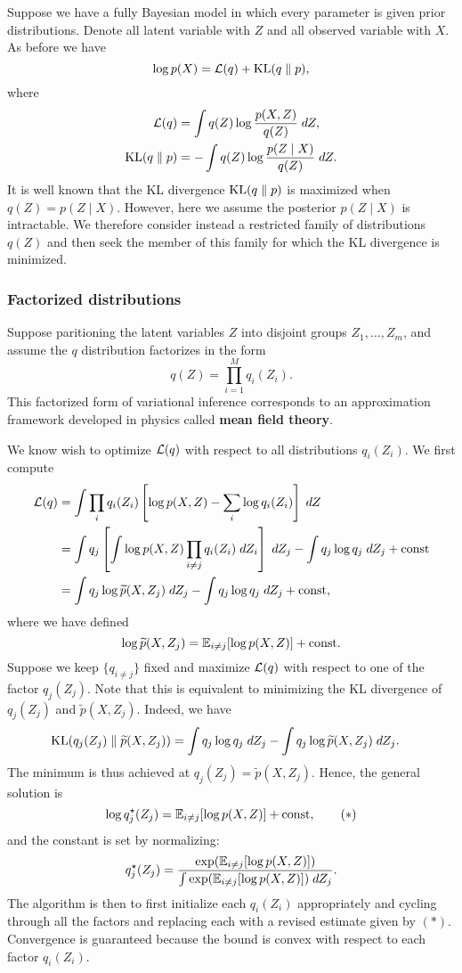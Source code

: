 \documentclass[a4paper]{article}
\begin{document}
Suppose we have a fully Bayesian model in which every parameter
is given prior distributions. Denote all latent variable with
$Z$ and all observed variable with $X$. As before we have
\[
\log p(X) = \mathcal{L}(q) + \mathrm{KL}(q \; \Vert \; p),
\]
where
\[
\begin{aligned}
  \mathcal{L}(q) &= \int q(Z) \log \frac{p(X, Z)}{q(Z)} \; d Z, \\
  \mathrm{KL}(q \; \Vert \; p) &= - \int q(Z) \log \frac{p(Z \mid X)}{q(Z)}
  \; d Z.
\end{aligned}
\]
It is well known that the KL divergence $\mathrm{KL}(q \; \Vert \; p)$ is
maximized when $q(Z) = p(Z \mid X)$. However, here we
assume the posterior $p(Z \mid X)$ is intractable.
We therefore consider instead a restricted family of
distributions $q(Z)$ and then seek the member of this
family for which the KL divergence is minimized.

\subsubsection{Factorized distributions}
Suppose paritioning the latent variables $Z$ into disjoint
groups $Z_1, \dots, Z_m$, and assume the $q$ distribution
factorizes in the form
\[
q(Z) = \prod_{i=1}^M q_i(Z_i).
\]
This factorized form of variational inference corresponds to an
approximation framework developed in physics called \textbf{mean
field theory}.

We know wish to optimize $\mathcal{L}(q)$ with respect to all distributions
$q_i(Z_i)$. We first compute
\[
\begin{aligned}
\mathcal{L}(q)
&= \int \prod_i q_i(Z_i) \left[ \log p(X, Z) - \sum_i
\log q_i(Z_i) \right] \; d Z \\
&= \int q_j \left[ \int \log p(X, Z) \prod_{i \neq j}
q_i(Z_i) \; d Z_i \right] \; d Z_j
- \int q_j \log q_j \; d Z_j + \mathrm{const} \\
&= \int q_j \log \widetilde{p} (X, Z_j) \; d Z_j
- \int q_j \log q_j \; d Z_j + \mathrm{const},
\end{aligned}
\]
where we have defined
\[
\log \widetilde{p} (X, Z_j) = \mathbb{E}_{i \neq j}
[\log p(X, Z)] + \mathrm{const}.
\]
Suppose we keep $\{q_{i \neq j}\}$ fixed and maximize
$\mathcal{L}(q)$ with respect to one of the factor
$q_j(Z_j)$. Note that this is equivalent
to minimizing the KL divergence of $q_j(Z_j)$ and $\tilde{p}
(X, Z_j)$. Indeed, we have 
\[
\begin{aligned}
\mathrm{KL}(q_j (Z_j) \; \Vert \; \widetilde{p}(X, Z_j)) 
&= \int q_j \log q_j \; d Z_j 
- \int q_j \log \widetilde{p} (X, Z_j) \; d Z_j. 
\end{aligned}
\]
The minimum is thus achieved at $q_j(Z_j)
= \tilde{p} (X, Z_j)$. Hence, the general solution is
\begin{equation*}
  \log q_j^\star (Z_j) = \mathbb{E}_{i \neq j} [\log p(X, Z)] +
  \mathrm{const},
  \tag{$*$}
\end{equation*}
and the constant is set by normalizing:
\[
q^\star_j(Z_j)
= \frac{\exp (\mathbb{E}_{i \neq j} [\log p(X, Z)])}
{\int \exp (\mathbb{E}_{i \neq j} [\log p(X, Z)]) \; d Z_j}.
\]
The algorithm is then to first initialize each $q_i (Z_i)$
appropriately and cycling through all the factors and
replacing each with a revised estimate given by $(*)$.
Convergence is guaranteed because the bound is convex
with respect to each factor $q_i(Z_i)$.
\end{document}
